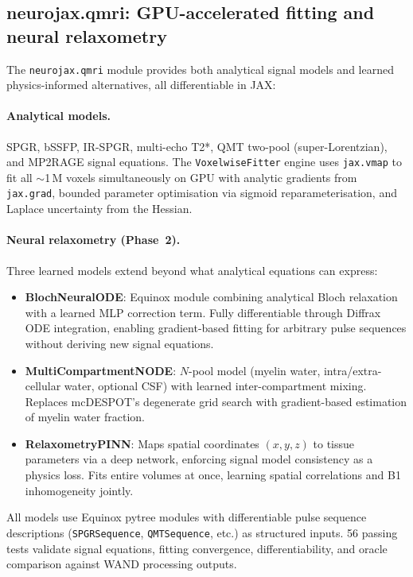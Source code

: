 \documentclass[11pt,a4paper]{article}\usepackage[]{graphicx}\usepackage[]{xcolor}
\begin{document}
\subsection{neurojax.qmri: GPU-accelerated fitting and neural relaxometry}

The \texttt{neurojax.qmri} module provides both analytical signal models
and learned physics-informed alternatives, all differentiable in JAX:

\paragraph{Analytical models.}
SPGR, bSSFP, IR-SPGR, multi-echo T2*, QMT two-pool
(super-Lorentzian), and MP2RAGE signal equations. The
\texttt{VoxelwiseFitter} engine uses \texttt{jax.vmap} to fit all
$\sim$1\,M voxels simultaneously on GPU with analytic gradients
from \texttt{jax.grad}, bounded parameter optimisation via sigmoid
reparameterisation, and Laplace uncertainty from the Hessian.

\paragraph{Neural relaxometry (Phase~2).}
Three learned models extend beyond what analytical equations can express:
\begin{itemize}
  \item \textbf{BlochNeuralODE}: Equinox module combining analytical
    Bloch relaxation with a learned MLP correction term.
    Fully differentiable through Diffrax ODE integration, enabling
    gradient-based fitting for arbitrary pulse sequences without
    deriving new signal equations.
  \item \textbf{MultiCompartmentNODE}: $N$-pool model (myelin water,
    intra/extra-cellular water, optional CSF) with learned inter-compartment
    mixing. Replaces mcDESPOT's degenerate grid search with
    gradient-based estimation of myelin water fraction.
  \item \textbf{RelaxometryPINN}: Maps spatial coordinates $(x,y,z)$
    to tissue parameters via a deep network, enforcing signal model
    consistency as a physics loss. Fits entire volumes at once,
    learning spatial correlations and B1 inhomogeneity jointly.
\end{itemize}
%
All models use Equinox pytree modules with differentiable pulse
sequence descriptions (\texttt{SPGRSequence}, \texttt{QMTSequence},
etc.) as structured inputs. 56 passing tests validate signal
equations, fitting convergence, differentiability, and oracle
comparison against WAND processing outputs.
\end{document}
